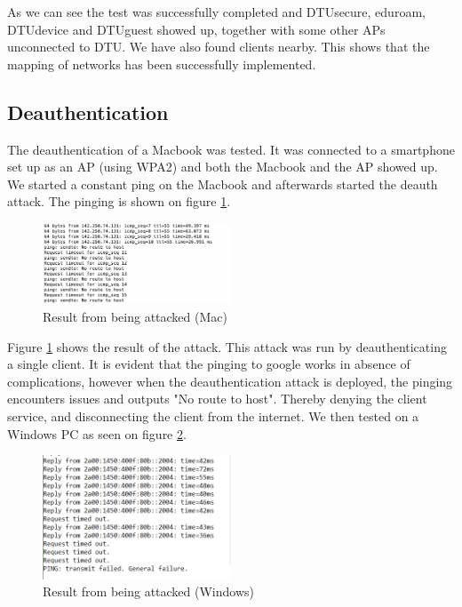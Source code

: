 As we can see the test was successfully completed and DTUsecure, eduroam, DTUdevice and DTUguest showed up, together with some other APs unconnected to DTU. We have also found clients nearby. This shows that the mapping of networks has been successfully implemented.


\subsection{Deauthentication}

The deauthentication of a Macbook was tested. It was connected to a smartphone set up as an AP (using WPA2) and both the Macbook and the AP showed up. We started a constant ping on the Macbook and afterwards started the deauth attack. The pinging is shown on figure \ref{Test2}.

\begin{figure}[!htbp]
     \centering
     \includegraphics[width=0.5\textwidth]{Latex-Files/Billeder/Tests/deauth_ping.png}
     \caption{Result from being attacked (Mac)}
     \label{Test2}
\end{figure}

Figure \ref{Test2} shows the result of the attack. This attack was run by deauthenticating a single client. It is evident that the pinging to google works in absence of complications, however when the deauthentication attack is deployed, the pinging encounters issues and outputs "No route to host". Thereby denying the client service, and disconnecting the client from the internet. We then tested on a Windows PC as seen on figure \ref{Test3}.

\begin{figure}[!htbp]
    \centering
    \includegraphics[width=0.5\textwidth]{Latex-Files/Billeder/Tests/Deauth virker.png}
    \caption{Result from being attacked (Windows)}
    \label{Test3}
\end{figure}

